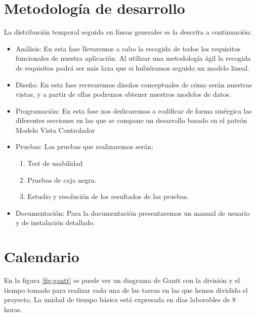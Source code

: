 

\section{Metodología de desarrollo}
La distribución temporal seguida en líneas generales es la descrita a
continuación:
\begin{itemize}
\item Análisis: En esta fase llevaremos a cabo la recogida de todos los
  requisitos funcionales de nuestra aplicación. Al utilizar una metodología ágil
  la recogida de requisitos podrá ser más laxa que si hubiéramos seguido un
  modelo lineal.
\item Diseño: En esta fase recrearemos diseños conceptuales de cómo serán
  nuestras vistas, y a partir de ellas podremos obtener nuestros modelos de
  datos.
\item Programación: En esta fase nos dedicaremos a codificar de forma sinérgica
  las diferentes secciones en las que se compone un desarrollo basado en el
  patrón Modelo Vista Controlador
\item Pruebas: Las pruebas que realizaremos serán:
  \begin{enumerate}
  \item Test de usabilidad
  \item Pruebas de caja negra.
  \item Estudio y resolución de los resultados de las pruebas.
  \end{enumerate}
\item Documentación: Para la documentación presentaremos un manual de usuario y
  de instalación detallado.
\end{itemize}

\section{Calendario}

En la figura \ref{fig:gantt} se puede ver un diagrama de Gantt con la división y
el tiempo tomado para realizar cada una de las tareas en las que hemos dividido
el proyecto. La unidad de tiempo básica está expresada en días laborables de 8
horas.

